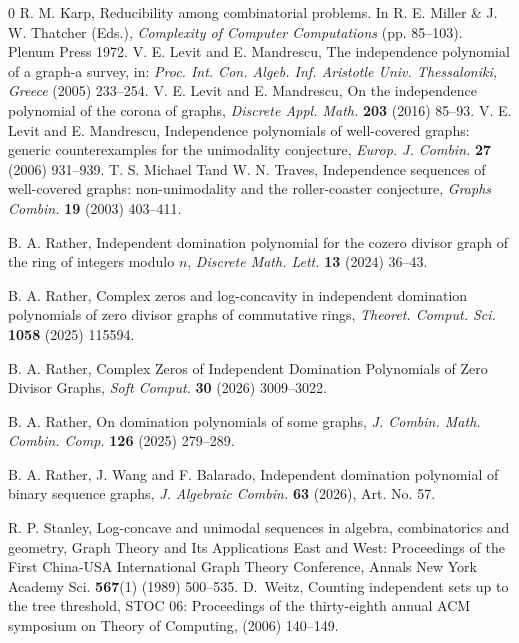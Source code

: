 \documentclass[12pt,twoside]{article}
\begin{document}
\begin{thebibliography}{0}
	 R. M. Karp, Reducibility among combinatorial problems. In R. E. Miller \& J. W. Thatcher (Eds.), \textit{Complexity of Computer Computations} (pp. 85–103). Plenum Press 1972.
	 V. E. Levit and E. Mandrescu, The independence polynomial of a graph-a survey, in: \emph{Proc. Int. Con. Algeb. Inf. Aristotle Univ. Thessaloniki, Greece} (2005) 233--254.
	 V. E. Levit and E. Mandrescu, On the independence polynomial of the corona of graphs, \emph{Discrete Appl. Math.} \textbf{203} (2016) 85--93.
	 V. E. Levit and E. Mandrescu, Independence polynomials of well-covered graphs: generic counterexamples for the unimodality conjecture, \textit{Europ. J. Combin.} \textbf{27} (2006)  931--939.
	 T. S. Michael Tand W. N. Traves, Independence sequences of well-covered graphs: non-unimodality and the roller-coaster conjecture, \textit{Graphs Combin.} \textbf{19} (2003) 403--411.
	
	 B. A. Rather, Independent domination polynomial for the cozero divisor graph of the ring of integers modulo $n$, \emph{Discrete Math. Lett.} \textbf{13} (2024) 36--43.
	
	 B. A. Rather, Complex zeros and log-concavity in independent domination polynomials of zero divisor graphs of commutative rings,  \emph{Theoret. Comput. Sci.} \textbf{1058} (2025) 115594.
	
	  B. A. Rather, Complex Zeros of Independent Domination Polynomials of Zero Divisor Graphs, \emph{Soft Comput.} \textbf{30} (2026) 3009--3022. %
	
	 B. A. Rather, On domination polynomials of some graphs, \textit{J. Combin. Math. Combin. Comp.} \textbf{126} (2025) 279--289.

	 B. A. Rather, J. Wang and F. Balarado, Independent domination polynomial of binary sequence graphs, \emph{J. Algebraic Combin.} \textbf{63} (2026), Art. No. 57. %

	 R. P. Stanley, Log-concave and unimodal sequences in algebra, combinatorics and geometry, Graph Theory and Its Applications East and West: Proceedings of the First China‐USA International Graph Theory Conference, Annals New York Academy Sci. \textbf{567}(1) (1989) 500--535. 
	 D.~Weitz, Counting independent sets up to the tree threshold, STOC 06: Proceedings of the thirty-eighth annual ACM symposium on Theory of Computing, (2006)  140--149.
	

\end{thebibliography}
\end{document}
